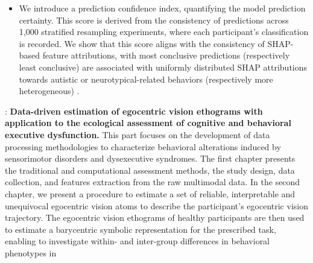 \begin{itemize}
    \item We introduce a prediction confidence index, quantifying the model prediction certainty. This score is derived from the consistency of predictions across 1,000 stratified resampling experiments, where each participant’s classification is recorded. We show that this score aligns with the consistency of SHAP-based feature attributions, with most conclusive predictions (respectively least conclusive) are associated with uniformly distributed SHAP attributions towards autistic or neurotypical-related behaviors (respectively more heterogeneous) .

\end{itemize} 


\textbf{}: \textbf{Data-driven estimation of egocentric vision ethograms with application to the ecological assessment of cognitive and behavioral executive dysfunction.} This part focuses on the development of data processing methodologies to characterize behavioral alterations induced by sensorimotor disorders and dysexecutive syndromes. The first chapter presents the traditional and computational assessment methods, the study design, data collection, and features extraction from the raw multimodal data. In the second chapter, we present a procedure to estimate a set of reliable, interpretable and unequivocal egocentric vision atoms to describe the participant's egocentric vision trajectory. The egocentric vision ethograms of healthy participants are then used to estimate a barycentric symbolic representation for the prescribed task, enabling to investigate within- and inter-group differences in behavioral phenotypes in  



